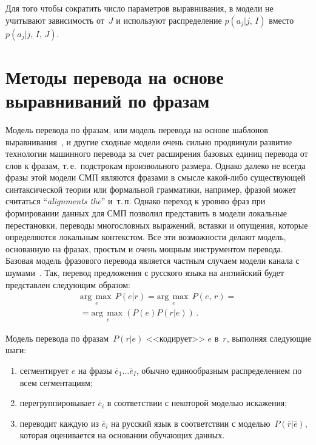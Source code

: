 \begin{multicols}{2}
\begin{enumerate}[(1)]
      Для того чтобы сократить число параметров выравнивания, в модели 
не учитывают зависимость от~$J$ и используют распределение $p(a_j\vert 
j,\,I)$ вместо $p(a_j\vert j,\,I,\,J)$.
      \end{enumerate}

\section{Методы перевода на основе выравниваний по фразам}
      
      Модель перевода по фразам, или модель перевода на основе шаблонов 
выравнивания~\cite{19koz}, и другие сходные модели очень сильно 
продвинули развитие технологии машинного перевода за счет расширения 
базовых единиц перевода от слов к фразам, т.\,е.\ подстрокам произвольного 
размера. Однако далеко не всегда фразы этой модели СМП являются 
фразами в смысле какой-либо существующей синтаксической теории или 
формальной грамматики, например, фразой может считаться 
``\textit{alignments the}'' и~т.\,п. Однако переход к уровню фраз при 
формировании данных для СМП позволил представить в модели локальные 
перестановки, переводы многословных выражений, вставки и опущения, 
которые определяются локальным контекстом. Все эти возможности делают 
модель, основанную на фразах, простым и очень мощным инструментом 
перевода. Базовая модель фразового перевода является частным случаем 
модели канала с шумами~\cite{2koz}. Так, перевод предложения с русского 
языка на английский будет представлен следующим образом:
      \begin{multline*}
      \underset{e}{\mathrm{arg}\,\max}\,P\left(e\vert r\right) 
=\underset{e}{\mathrm{arg}\,\max}\,P\left(e,\, r\right)={}\\ 
{}=\underset{e}{\mathrm{arg}\,\max}\left ( P(e) P(r\vert e)\right)\,.
      \end{multline*}
      
      Модель перевода по фразам~$P(r\vert e)$ <<кодирует>> $e$ в~$r$, 
выполняя следующие шаги:
      \begin{enumerate}[1)]
\item сегментирует $e$ на фразы $\overline{e}_1\ldots \overline{e}_I$, 
обычно единообразным распределением по всем сегментациям;
\item перегруппировывает $\overline{e}_i$ в соответствии с некоторой 
моделью искажения;
\item переводит каждую из $\overline{e}_i$ на русский язык в 
соответствии с моделью~$P(\overline{r}\vert\overline{e})$, которая 
оценивается на основании обучающих данных.
\end{enumerate}


\end{multicols}
